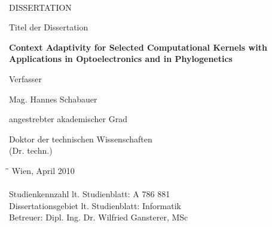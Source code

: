 \begin{titlepage}
  \centering
  \begin{flushright}
    \hspace{4cm}  \\
  \end{flushright}
  \vspace{1cm}
  \begin{LARGE}
    DISSERTATION \\
  \end{LARGE}
  \vspace{1.5cm}
    Titel der Dissertation \\
  \begin{LARGE}
    \textbf{Context Adaptivity for Selected Computational Kernels with Applications in Optoelectronics and in Phylogenetics \\}
  \end{LARGE}
  \vspace{1.5cm}
    Verfasser \\
  \begin{LARGE}
    Mag. Hannes Schabauer \\
  \end{LARGE}
  \vspace{1.5cm}
    angestrebter akademischer Grad \\
  \begin{LARGE}
    Doktor der technischen Wissenschaften \\
    (Dr. techn.) \\
  \end{LARGE}
  \vspace{1.5cm}
  \begin{tabbing}
    \=\hspace*{6.8cm}\= \kill
    Wien, April 2010 \\
    \vspace{2cm} \\
    \>Studienkennzahl lt. Studienblatt: \>A 786 881  \\
    \>Dissertationsgebiet lt. Studienblatt: \>Informatik \\
    \>Betreuer: \>Dipl. Ing. Dr. Wilfried Gansterer, MSc \\
  \end{tabbing}
\end{titlepage}

